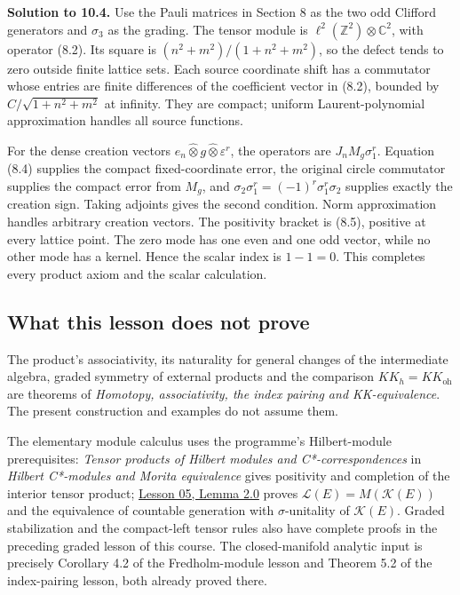 \documentclass[
  11pt,
]{article}
\begin{document}
\textbf{Solution to 10.4.} Use the Pauli matrices in Section 8 as the
two odd Clifford generators and \(\sigma_3\) as the grading. The tensor
module is \(\ell^2(\mathbb Z^2)\otimes\mathbb C^2\), with operator
(8.2). Its square is \((n^2+m^2)/(1+n^2+m^2)\), so the defect tends to
zero outside finite lattice sets. Each source coordinate shift has a
commutator whose entries are finite differences of the coefficient
vector in (8.2), bounded by \(C/\sqrt{1+n^2+m^2}\) at infinity. They are
compact; uniform Laurent-polynomial approximation handles all source
functions.

For the dense creation vectors
\(e_n\widehat\otimes g\widehat\otimes\varepsilon^r\), the operators are
\(J_nM_g\sigma_1^r\). Equation (8.4) supplies the compact
fixed-coordinate error, the original circle commutator supplies the
compact error from \(M_g\), and
\(\sigma_2\sigma_1^r=(-1)^r\sigma_1^r\sigma_2\) supplies exactly the
creation sign. Taking adjoints gives the second condition. Norm
approximation handles arbitrary creation vectors. The positivity bracket
is (8.5), positive at every lattice point. The zero mode has one even
and one odd vector, while no other mode has a kernel. Hence the scalar
index is \(1-1=0\). This completes every product axiom and the scalar
calculation.

\subsection{What this lesson does not
prove}\label{what-this-lesson-does-not-prove}

The product's associativity, its naturality for general changes of the
intermediate algebra, graded symmetry of external products and the
comparison \(KK_h=KK_{\mathrm{oh}}\) are theorems of \emph{Homotopy,
associativity, the index pairing and KK-equivalence}. The present
construction and examples do not assume them.

The elementary module calculus uses the programme's Hilbert-module
prerequisites: \emph{Tensor products of Hilbert modules and
C*-correspondences} in \emph{Hilbert C*-modules and Morita equivalence}
gives positivity and completion of the interior tensor product;
\href{KT-KK-05.html\#lemma-2-0-compact-module-operators-and-their-multipliers}{Lesson
05, Lemma 2.0} proves \(\mathcal L(E)=M(\mathcal K(E))\) and the
equivalence of countable generation with \(\sigma\)-unitality of
\(\mathcal K(E)\). Graded stabilization and the compact-left tensor
rules also have complete proofs in the preceding graded lesson of this
course. The closed-manifold analytic input is precisely Corollary 4.2 of
the Fredholm-module lesson and Theorem 5.2 of the index-pairing lesson,
both already proved there.
\end{document}
